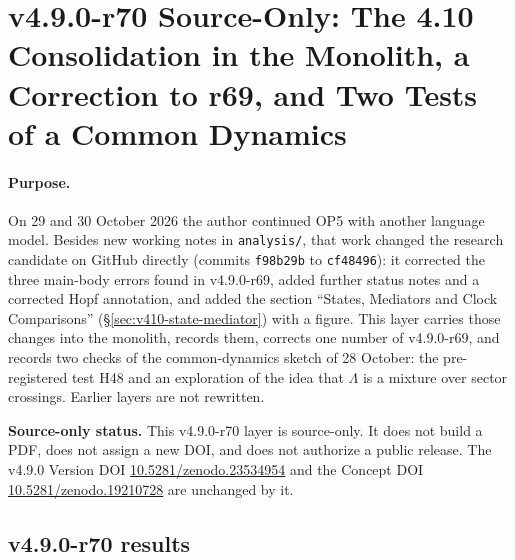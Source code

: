 \clearpage
\section*{v4.9.0-r70 Source-Only: The 4.10 Consolidation in the Monolith, a Correction to r69, and Two Tests of a Common Dynamics}
\label{sec:v490-r70-consolidation}

\paragraph{Purpose.}
On 29 and 30 October 2026 the author continued OP5 with another language model.  Besides new working notes in \texttt{analysis/}, that work
changed the research candidate on GitHub directly (commits \texttt{f98b29b} to \texttt{cf48496}): it corrected the three main-body errors found in
v4.9.0-r69, added further status notes and a corrected Hopf annotation, and added the section ``States, Mediators and Clock Comparisons''
(\S\ref{sec:v410-state-mediator}) with a figure.  This layer carries those changes into the monolith, records them, corrects one number of
v4.9.0-r69, and records two checks of the common-dynamics sketch of 28 October: the pre-registered test H48 and an exploration of the idea that
\(\Lambda\) is a mixture over sector crossings.  Earlier layers are not rewritten.

\noindent\textbf{Source-only status.}
This v4.9.0-r70 layer is source-only.  It does not build a PDF, does not assign a new DOI,
and does not authorize a public release.  The v4.9.0 Version DOI
\href{https://doi.org/10.5281/zenodo.23534954}{10.5281/zenodo.23534954} and the Concept DOI
\href{https://doi.org/10.5281/zenodo.19210728}{10.5281/zenodo.19210728} are unchanged by it.

\subsection*{v4.9.0-r70 results}
\label{subsec:v490-r70-results}

